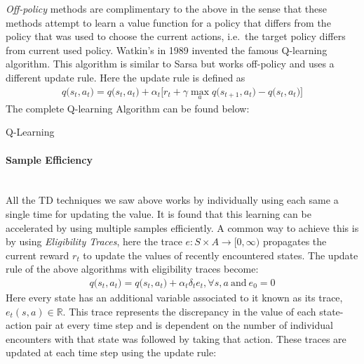 \documentclass[14pt]{extarticle}
\newcommand{\myparagraph}[1]{\paragraph{#1}\mbox{}\\ \linebreak}
\numberwithin{equation}{section}
\begin{document}
	\textit{Off-policy} methods are complimentary to the above in the sense that these methods attempt to learn a value function for a policy that differs from the policy that was used to choose the current actions, i.e.\ the target policy differs from current used policy. Watkin's in 1989 invented the famous Q-learning algorithm\cite{watkins1989Qlearning}. This algorithm is similar to Sarsa but works off-policy and uses a different update rule. Here the update rule is defined as 
	\begin{align}\label{eq:q-update}
	q\big(s_t,a_t\big) = q\big(s_t,a_t\big) + \alpha_t\big[r_t + \gamma \max_{a}q\big(s_{t+1},a_t\big) - q\big(s_t,a_t\big)\big]
	\end{align}
	The complete Q-learning Algorithm can be found below:
	\begin{algorithm}[h]
		\DontPrintSemicolon
		\SetAlgoLined
		
		\caption{Q-Learning}\label{alg:q-learning}
	\end{algorithm}
	\myparagraph{Sample Efficiency}
	All the TD techniques we saw above works by individually using each same a single time for updating the value. It is found that this learning can be accelerated by using multiple samples efficiently. A common way to achieve this is by using \textit{Eligibility Traces}, here the trace $e \colon S \times A \rightarrow [0,\infty)$ propagates the current reward $r_t$ to update the values of recently encountered states. The update rule of the above algorithms with eligibility traces become:
	\begin{align}
	q\big(s_t,a_t\big) = q\big(s_t,a_t\big) + \alpha_t\delta_{t}e_t, \forall s,a \ \text{and} \ e_0 = 0
	\end{align}
	Here every state has an additional variable associated to it known as its trace, $e_t(s,a) \in \mathbb{R}$. This trace represents the discrepancy in the value of each state-action pair at every time step and is dependent on the number of individual encounters with that state was followed by taking that action. These traces are updated at each time step using the update rule:
\end{document}

